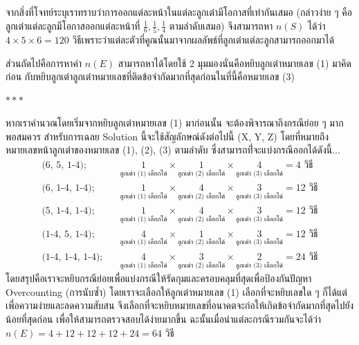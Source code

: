 \documentclass[11pt]{scrartcl}
\begin{document}
\begin{solutionbox}
  จากสิ่งที่โจทย์ระบุเราทราบว่าการออกแต่ละหน้าในแต่ละลูกเต๋ามีโอกาสที่เท่ากันเสมอ (กล่าวง่าย ๆ คือ ลูกเต๋าแต่ละลูกมีโอกาสออกแต่ละหน้าที่ $\frac{1}{6}, \frac{1}{5}, \frac{1}{4}$ ตามลำดับเสมอ) 
  จึงสามารถหา ${n(S)}$ ได้ว่า $4 \times 5 \times 6 = 120$ วิธีเพราะว่าแต่ละตัวที่คูณนั้นมาจากผลลัพธ์ที่ลูกเต๋าแต่ละลูกสามารถออกมาได้

  ส่วนถัดไปคือการหาค่า ${n(E)}$ สามารถหาได้โดยใช้ 2 มุมมองนั่นคือหยิบลูกเต๋าหมายเลข (1) มาคิดก่อน กับหยิบลูกเต๋าลูกเต๋าหมายเลขที่ติดข้อจำกัดมากที่สุดก่อนในที่นี้คือหมายเลข (3)

  \noindent\dotfill\quad$ *** $\quad\dotfill
  
  \underline{}

  หากเราคำนวณโดยเริ่มจากหยิบลูกเต๋าหมายเลข (1) มาก่อนนั้น จะต้องพิจารณาถึงกรณีย่อย ๆ มากพอสมควร
  สำหรับการเฉลย Solution นี้จะใช้สัญลักษณ์ดังต่อไปนี้ (X, Y, Z) โดยที่หมายถึงหมายเลขหน้าลูกเต๋าของหมายเลข (1), (2), (3) ตามลำดับ
  ซึ่งสามารถที่่จะแบ่งกรณีออกได้ดังนี้...
  \begin{align*}
    \text{(6, 5, 1-4);} \quad &
    \underset{\text{ลูกเต๋า (1) เลือกได้}}{1} \times 
    \underset{\text{ลูกเต๋า (2) เลือกได้}}{1} \times 
    \underset{\text{ลูกเต๋า (3) เลือกได้}}{4}
    = 4 \text{ วิธี} \\[1ex]
    \text{(6, 1-4, 1-4);} \quad &
    \underset{\text{ลูกเต๋า (1) เลือกได้}}{1} \times 
    \underset{\text{ลูกเต๋า (2) เลือกได้}}{4} \times 
    \underset{\text{ลูกเต๋า (3) เลือกได้}}{3}
    = 12 \text{ วิธี} \\[1ex]
    \text{(5, 1-4, 1-4);} \quad &
    \underset{\text{ลูกเต๋า (1) เลือกได้}}{1} \times 
    \underset{\text{ลูกเต๋า (2) เลือกได้}}{4} \times 
    \underset{\text{ลูกเต๋า (3) เลือกได้}}{3}
    = 12 \text{ วิธี} \\[1ex]
    \text{(1-4, 5, 1-4);} \quad &
    \underset{\text{ลูกเต๋า (1) เลือกได้}}{4} \times 
    \underset{\text{ลูกเต๋า (2) เลือกได้}}{1} \times 
    \underset{\text{ลูกเต๋า (3) เลือกได้}}{3}
    = 12 \text{ วิธี} \\[1ex]
    \text{(1-4, 1-4, 1-4);} \quad &
    \underset{\text{ลูกเต๋า (1) เลือกได้}}{4} \times 
    \underset{\text{ลูกเต๋า (2) เลือกได้}}{3} \times 
    \underset{\text{ลูกเต๋า (3) เลือกได้}}{2}
    = 24 \text{ วิธี}
  \end{align*}
  โดยสรุปคือเราจะหยิบกรณีย่อยเพื่อแบ่งกรณีให้รัดกุมและครอบคลุมที่สุดเพื่อป้องกันปัญหา Overcounting (การนับซ้ำ) 
  โดยเราจะเลือกให้ลูกเต๋าหมายเลข (1) เลือกที่จะหยิบเลขใด ๆ ก็ได้แต่เพื่อความง่ายและลดความสับสน 
  จึงเลือกที่จะหยิบหมายเลขที่อนาคตจะก่อให้เกิดข้อจำกัดมากที่สุดไปยังน้อยที่สุดก่อน เพื่อให้สามารถตรวจสอบได้ง่ายมากขึ้น
  ฉะนั้นเมื่อนำแต่ละกรณีรวมกันจะได้ว่า $n(E) = 4+12+12+12+24=64$ วิธี


\end{solutionbox}
\end{document}
